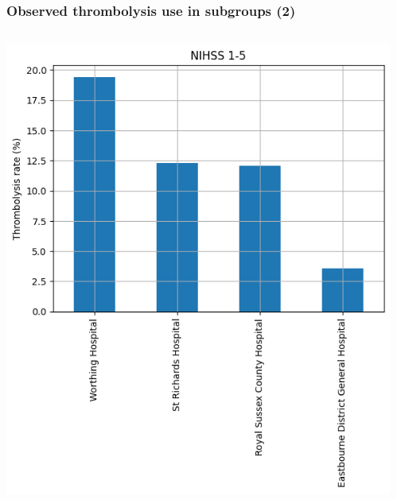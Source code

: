 \begin{frame}
\frametitle{Observed thrombolysis use in subgroups (2)}

  \begin{columns}[T]
    \begin{column}{0.5\textwidth}
      \includegraphics[width=1.0\textwidth]{./sussex/images/subgroup_mild}
    \end{column}
    \begin{column}{0.5\textwidth}

\end{column}
\end{columns}
\end{frame}
